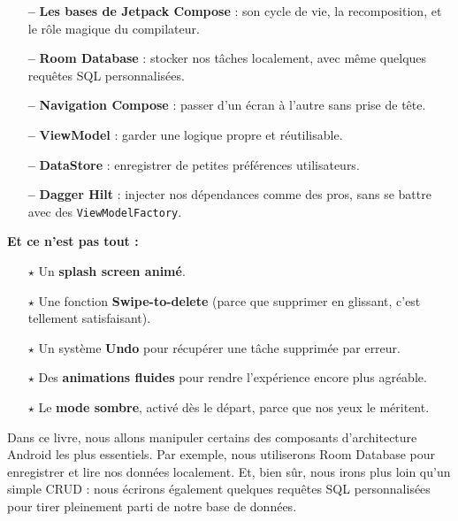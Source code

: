 \vspace{2em} %
\vspace{2em} %
\begin{tcolorbox}[colback=orange!5!white, colframe=orange!80!black, 
title=\textbf{Voici ce qui t’attend}, sharp corners, boxrule=0.6pt]

\begin{itemize}
    \item[\textbf{--}] \textbf{Les bases de Jetpack Compose} : son cycle de vie, la recomposition, et le rôle magique du compilateur.
    \item[\textbf{--}] \textbf{Room Database} : stocker nos tâches localement, avec même quelques requêtes SQL personnalisées.
    \item[\textbf{--}] \textbf{Navigation Compose} : passer d’un écran à l’autre sans prise de tête.
    \item[\textbf{--}] \textbf{ViewModel} : garder une logique propre et réutilisable.
    \item[\textbf{--}] \textbf{DataStore} : enregistrer de petites préférences utilisateurs.
    \item[\textbf{--}] \textbf{Dagger Hilt} : injecter nos dépendances comme des pros, sans se battre avec des \texttt{ViewModelFactory}.
\end{itemize}

\vspace{0.5em}
\textbf{Et ce n’est pas tout :}

\begin{itemize}
    \item[$\star$] Un \textbf{splash screen animé}.
    \item[$\star$] Une fonction \textbf{Swipe-to-delete} (parce que supprimer en glissant, c’est tellement satisfaisant).
    \item[$\star$] Un système \textbf{Undo} pour récupérer une tâche supprimée par erreur.
    \item[$\star$] Des \textbf{animations fluides} pour rendre l’expérience encore plus agréable.
    \item[$\star$] Le \textbf{mode sombre}, activé dès le départ, parce que nos yeux le méritent.
\end{itemize}

\end{tcolorbox}

\newpage
\noindent Dans ce livre, nous allons manipuler certains des composants d’architecture Android les plus essentiels.
Par exemple, nous utiliserons Room Database pour enregistrer et lire nos données localement. Et, bien sûr, nous irons plus loin qu’un simple CRUD : nous écrirons également quelques requêtes SQL personnalisées pour tirer pleinement parti de notre base de données.

